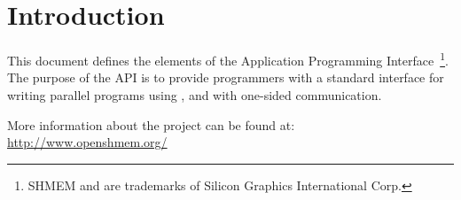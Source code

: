 \section{Introduction}

This document defines the elements of the \openshmem  Application Programming
Interface~\footnote{SHMEM and \openshmem  are trademarks of Silicon Graphics International Corp.}.
The purpose of the \openshmem  API is to provide programmers
with a standard interface for writing parallel programs
using \Clang, \Cpp{} and \Fortran{} with one-sided communication.

More information about the \openshmem  project can be found at:\\
\url{http://www.openshmem.org/}
